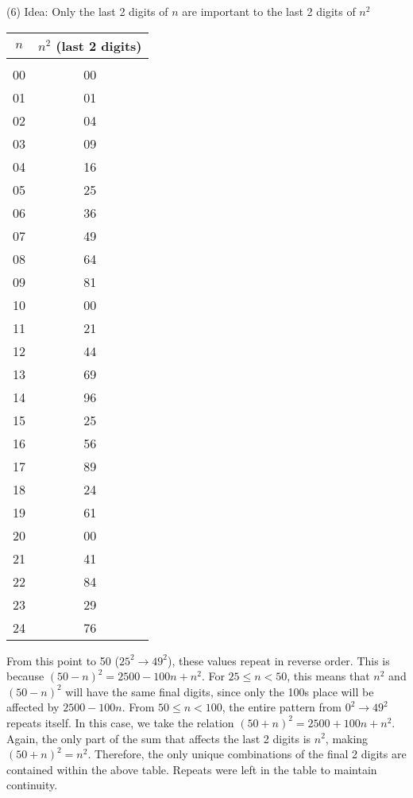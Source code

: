 \documentclass[]{article}
\begin{document}
\noindent (6) Idea: Only the last 2 digits of $n$ are important to the last 2 digits of $n^2$ \\

\begin{tabular}{c c}

	$n$ & $n^2$ (last 2 digits) \\

	\hline \\

	00 & 00 \\
	01 & 01 \\
	02 & 04 \\
	03 & 09 \\
	04 & 16 \\
	05 & 25 \\
	06 & 36 \\
	07 & 49 \\
	08 & 64 \\
	09 & 81 \\
	10 & 00 \\
	11 & 21 \\
	12 & 44 \\
	13 & 69 \\
	14 & 96 \\
	15 & 25 \\
	16 & 56 \\
	17 & 89 \\
	18 & 24 \\
	19 & 61 \\
	20 & 00 \\
	21 & 41 \\
	22 & 84 \\
	23 & 29 \\
	24 & 76 \\
\end{tabular}

From this point to 50 ($25^2 \rightarrow 49^2$), these values repeat in reverse order. This is because $(50-n)^2 = 2500-100n+n^2$. For $25 \leq n < 50$, this means that $n^2$ and $(50-n)^2$ will have the same final digits, since only the 100s place will be affected by $2500-100n$. From $50 \leq n < 100$, the entire pattern from $0^2 \rightarrow 49^2$ repeats itself. In this case, we take the relation $(50+n)^2 = 2500 + 100n + n^2$. Again, the only part of the sum that affects the last 2 digits is $n^2$, making $(50+n)^2 = n^2$. Therefore, the only unique combinations of the final 2 digits are contained within the above table. Repeats were left in the table to maintain continuity.
\end{document}
